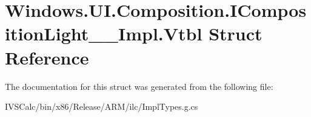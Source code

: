 \hypertarget{struct_windows_1_1_u_i_1_1_composition_1_1_i_composition_light_____impl_1_1_vtbl}{}\section{Windows.\+U\+I.\+Composition.\+I\+Composition\+Light\+\_\+\+\_\+\+Impl.\+Vtbl Struct Reference}
\label{struct_windows_1_1_u_i_1_1_composition_1_1_i_composition_light_____impl_1_1_vtbl}


The documentation for this struct was generated from the following file\+:\begin{DoxyCompactItemize}
\item 
I\+V\+S\+Calc/bin/x86/\+Release/\+A\+R\+M/ilc/Impl\+Types.\+g.\+cs\end{DoxyCompactItemize}
